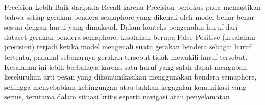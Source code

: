 \documentclass[12pt,a4paper]{article}
\begin{document}
\begin{adjustwidth}{3em}{0pt}
\hspace{0.5cm} Precision Lebih Baik daripada Recall karena Precision berfokus pada memastikan bahwa setiap gerakan bendera semaphore yang dikenali oleh model benar-benar sesuai dengan huruf yang dimaksud. Dalam konteks pengenalan huruf dari dataset gerakan bendera semaphore, kesalahan berupa False Positive (kesalahan precision) terjadi ketika model mengenali suatu gerakan bendera sebagai huruf tertentu, padahal sebenarnya gerakan tersebut tidak mewakili huruf tersebut. Kesalahan ini lebih berbahaya karena satu huruf yang salah dapat mengubah keseluruhan arti pesan yang dikomunikasikan menggunakan bendera semaphore, sehingga menyebabkan kebingungan atau bahkan kegagalan komunikasi yang serius, terutama dalam situasi kritis seperti navigasi atau penyelamatan
\end{adjustwidth}

\end{document}
